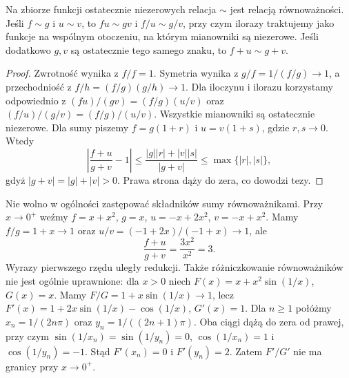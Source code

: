 \begin{twierdzenie}
\label{ma1:thm:asymptotic-equivalence-algebra}
Na zbiorze funkcji ostatecznie niezerowych relacja $\sim$ jest relacją równoważności. Jeśli $f\sim g$ i $u\sim v$, to $fu\sim gv$ i $f/u\sim g/v$, przy czym ilorazy traktujemy jako funkcje na wspólnym otoczeniu, na którym mianowniki są niezerowe. Jeśli dodatkowo $g,v$ są ostatecznie tego samego znaku, to $f+u\sim g+v$.
\end{twierdzenie}
\begin{proof}
Zwrotność wynika z $f/f=1$. Symetria wynika z $g/f=1/(f/g)\to1$, a przechodniość z $f/h=(f/g)(g/h)\to1$. Dla iloczynu i ilorazu korzystamy odpowiednio z $(fu)/(gv)=(f/g)(u/v)$ oraz $(f/u)/(g/v)=(f/g)/(u/v)$. Wszystkie mianowniki są ostatecznie niezerowe. Dla sumy piszemy $f=g(1+r)$ i $u=v(1+s)$, gdzie $r,s\to0$. Wtedy
\[
 \left|\frac{f+u}{g+v}-1\right|
 \le\frac{|g||r|+|v||s|}{|g+v|}
 \le\max\{|r|,|s|\},
\]
gdyż $|g+v|=|g|+|v|>0$. Prawa strona dąży do zera, co dowodzi tezy.
\end{proof}
\begin{przyklad}
\label{ma1:ex:asymptotic-cancellation}
Nie wolno w ogólności zastępować składników sumy równoważnikami. Przy $x\to0^+$ weźmy $f=x+x^2$, $g=x$, $u=-x+2x^2$, $v=-x+x^2$. Mamy $f/g=1+x\to1$ oraz $u/v=(-1+2x)/(-1+x)\to1$, ale
\[
 \frac{f+u}{g+v}=\frac{3x^2}{x^2}=3.
\]
Wyrazy pierwszego rzędu uległy redukcji. Także różniczkowanie równoważników nie jest ogólnie uprawnione: dla $x>0$ niech $F(x)=x+x^2\sin(1/x)$, $G(x)=x$. Mamy $F/G=1+x\sin(1/x)\to1$, lecz
$F'(x)=1+2x\sin(1/x)-\cos(1/x)$, $G'(x)=1$. Dla $n\ge1$ połóżmy $x_n=1/(2n\pi)$ oraz $y_n=1/((2n+1)\pi)$. Oba ciągi dążą do zera od prawej, przy czym $\sin(1/x_n)=\sin(1/y_n)=0$, $\cos(1/x_n)=1$ i $\cos(1/y_n)=-1$. Stąd $F'(x_n)=0$ i $F'(y_n)=2$. Zatem $F'/G'$ nie ma granicy przy $x\to0^+$.
\end{przyklad}

